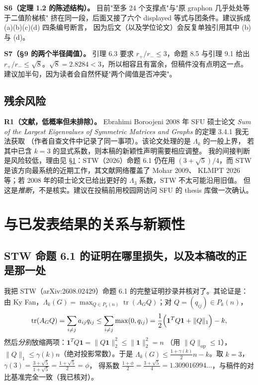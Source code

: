 \documentclass[UTF8,11pt]{ctexart}
\theoremstyle{definition}
\newcommand{\tr}{\operatorname{tr}}
\begin{document}
\textbf{S6（定理 1.2 的陈述结构）。} 目前"至多 24 个支撑点"与"原 graphon 几乎处处等于二值阶梯核"
挤在同一段，后面又接了六个 displayed 等式与团条件。建议拆成 (a)(b)(c)(d) 四条编号断言，
因为后文（以及学位论文）会反复单独引用其中 (b) 与 (d)。

\textbf{S7（\S9 的两个半径阈值）。} 引理 6.3 要求 $r_+/r_-\le3$，命题 8.5 与引理 9.1 给出
$r_+/r_-\le\sqrt8$。$\sqrt8=2.8284<3$，所以相容且有富余，但稿件没有点明这一点。
建议加半句，因为读者会自然怀疑"两个阈值是否冲突"。

\subsection{残余风险}

\textbf{R1（文献，低概率但未排除）。} Ebrahimi Boroojeni 2008 年 SFU 硕士论文
\emph{Sum of the Largest Eigenvalues of Symmetric Matrices and Graphs} 的定理 3.4.1 我无法获取
（作者自查文件中记录了同一事项）。该论文处理的是 $\Lambda_k$ 的一般上界，
若其中已含 $k=3$ 的显式系数，则本稿的新颖性声明需要相应调整。
我的间接判断是风险较低，理由见 \S\ref{sec:novel}：STW（2026）命题 6.1 仍在用
$(3+\sqrt5)/4$，而 STW 是该方向最系统的近期工作，其文献网络覆盖了 Mohar 2009、
KLMPT 2026 等；若 2008 年的硕士论文已给出更好的 $\Lambda_3$ 系数，STW 不太可能沿用旧值。
但这是\emph{推断}，不是核实。建议在投稿前用校园网访问 SFU 的 thesis 库做一次确认。

\section{与已发表结果的关系与新颖性}\label{sec:novel}

\subsection{STW 命题 6.1 的证明在哪里损失，以及本稿改的正是那一处}

我把 STW（arXiv:2608.02429）命题 6.1 的完整证明抄录并核对了。其论证是：
由 Ky Fan，$\Lambda_k(G)=\max_{Q\in P_k(n)}\tr(A_GQ)$；对 $Q=(q_{ij})\in P_k(n)$，
\[
 \tr(A_GQ)=\sum_{i\ne j}a_{ij}q_{ij}\le\sum_{i\ne j}\max(0,q_{ij})
         =\frac12\Bigl(\mathbf1^TQ\mathbf1+\|Q\|_1\Bigr)-k,
\]
然后\emph{分别}放缩两项：$\mathbf1^TQ\mathbf1=\|Q\mathbf1\|_2^2\le\|\mathbf1\|_2^2=n$
（用 $\|Q\|_{\mathrm{op}}\le1$），$\|Q\|_1\le\gamma(k)n$（绝对投影常数）。于是
$\Lambda_k(G)\le\frac{1+\gamma(k)}2n-k$。取 $k=3$，$\gamma(3)=\frac{3+\sqrt5}{1+\sqrt5}=\frac{1+\sqrt5}2=\phi$，
得系数 $\frac{1+\phi}2=\frac{3+\sqrt5}4=1.309016994\ldots$，与稿件的对比基准完全一致（我已核对）。
\end{document}
